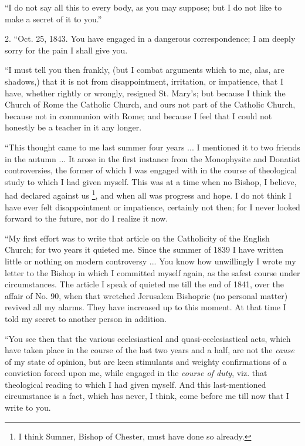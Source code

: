 ``I do not say all this to every body, as you may suppose; but I
do not like to make a secret of it to you.''

2. ``Oct. 25, 1843. You have engaged in a dangerous
correspondence; I am deeply sorry for the pain I shall give you.

``I must tell you then frankly, (but I combat arguments which to
me, alas, are shadows,) that it is not from disappointment, irritation,
or impatience, that I have, whether rightly or wrongly, resigned St.
Mary's; but because I think the Church of Rome the Catholic Church, and
ours not part of the Catholic Church, because not in communion with
Rome; and because I feel that I could not honestly be a teacher in it
any longer.

``This thought came to me last summer four years ... I mentioned
it to two friends in the autumn ... It arose in the first instance from
the Monophysite and Donatist controversies, the former of which I was
engaged with in the course of theological study to which I had given
myself. This was at a time when no Bishop, I believe, had declared
against us \footnote{I think Sumner, Bishop
of Chester, must have done so already.}, and when all was progress and hope. I do
not think I have ever felt disappointment or impatience, certainly
not then; for I never looked forward to the future, nor do I realize it
now.

``My first effort was to write that article on the Catholicity of
the English Church; for two years it quieted me. Since the summer of
1839 I have written little or nothing on modern controversy ... You know
how unwillingly I wrote my letter to the Bishop in which I committed
myself again, as the safest course under circumstances. The article I
speak of quieted me till the end of 1841, over the affair of No. 90, when
that wretched Jerusalem Bishopric (no personal matter) revived all my
alarms. They have increased up to this moment. At that time I told my
secret to another person in addition.

``You see then that the various ecclesiastical and
quasi-ecclesiastical acts, which have taken place in the course of the
last two years and a half, are not the \emph{cause} of my state of
opinion, but are keen stimulants and weighty confirmations of a
conviction forced upon me, while engaged in the \emph{course of duty},
viz. that theological reading to which I had given myself. And this
last-mentioned circumstance is a fact, which has never, I think, come
before me till now that I write to you.

